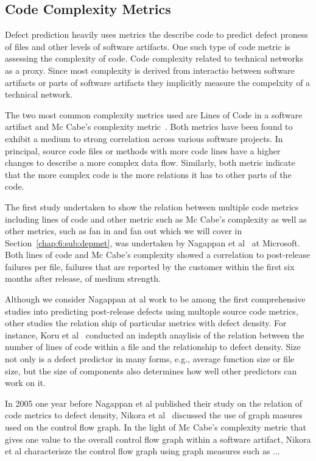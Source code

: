 \subsection{Code Complexity Metrics}
Defect prediction heavily uses metrics the describe code to predict defect proness of files and other levels of software artifacts.
One such type of code metric is assessing the complexity of code.
Code complexity related to technical networks as a proxy.
Since most complexity is derived from interactio between software artifacts or parts of software artifacts they implicitly measure the compelxity of a technical network.

The two most common complexity metrics used are Lines of Code in a software artifact and Mc Cabe's complexity metric~\cite{mccabe:ieee:1976}.
Both metrics have been found to exhibit a medium to strong correlation across various software projects.
In principal, source code files or methods with more code lines have a higher changes to describe a more complex data flow.
Similarly, both metric indicate that the more complex code is the more relations it has to other parts of the code.

The first study undertaken to show the relation between multiple code metrics including lines of code and other metric such as Mc Cabe's complexity as well as other metrics, such as fan in and fan out which we will cover in Section~\ref{chap:6:sub:depmet}, was undertaken by Nagappan et al~\cite{nagappan:icse:2006} at Microsoft.
Both lines of code and Mc Cabe's complexity showed a correlation to post-release failures per file, failures that are reported by the customer within the first six months after release, of medium strength.

Although we consider Nagappan at al work to be among the first comprehensive studies into predicting post-release defects using multople source code metrics, other studies the relation ship of particular metrics with defect density.
For instance, Koru et al~\cite{koru:promise:2005} conducted an indepth anaylisis of the relation between the number of lines of code within a file and the relationship to defect density.
Size not only is a defect predictor in many forms, e.g., average function size or file size, but the size of components also determines how well other predictors can work on it.

In 2005 one year before Nagappan et al published their study on the relation of code metrics to defect density, Nikora et al~\cite{nikora:isese:2006} discussed the use of graph masures used on the control flow graph.
In the light of Mc Cabe's complexity metric that gives one value to the overall control flow graph within a software artifact, Nikora et al characterisze the control flow graph using graph measures such as ...

